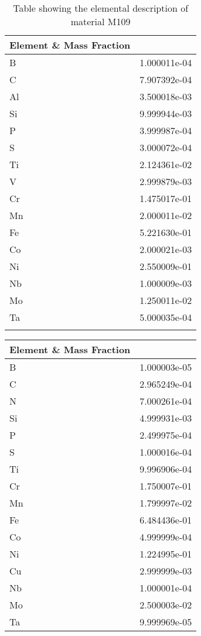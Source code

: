 \begin{centering}
\begin{longtable}[ht!]
{ p{} | p{} }
\hline
Element \& Mass Fraction\\
\hline

B &  1.000011e-04\\
C &  7.907392e-04\\
Al &  3.500018e-03\\
Si &  9.999944e-03\\
P &  3.999987e-04\\
S &  3.000072e-04\\
Ti &  2.124361e-02\\
V &  2.999879e-03\\
Cr &  1.475017e-01\\
Mn &  2.000011e-02\\
Fe &  5.221630e-01\\
Co &  2.000021e-03\\
Ni &  2.550009e-01\\
Nb &  1.000009e-03\\
Mo &  1.250011e-02\\
Ta &  5.000035e-04\\

\caption{Table showing the elemental description of material M109}
\label{table:material_M109}
\end{longtable}
\clearpage

\begin{longtable}[ht!]
{ p{} | p{} }
\hline
Element \& Mass Fraction\\
\hline
B &  1.000003e-05\\
C &  2.965249e-04\\
N &  7.000261e-04\\
Si &  4.999931e-03\\
P &  2.499975e-04\\
S &  1.000016e-04\\
Ti &  9.996906e-04\\
Cr &  1.750007e-01\\
Mn &  1.799997e-02\\
Fe &  6.484436e-01\\
Co &  4.999999e-04\\
Ni &  1.224995e-01\\
Cu &  2.999999e-03\\
Nb &  1.000001e-04\\
Mo &  2.500003e-02\\
Ta &  9.999969e-05\\


\end{longtable}
\end{centering}
